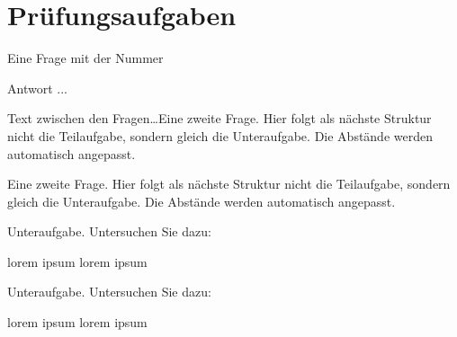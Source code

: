 \documentclass[a4paper,12pt]{article}
\begin{document}
\section{Prüfungsaufgaben}


\begin{question}
	Eine Frage mit der Nummer %
{}
\end{question}%
%
\begin{solution}
	Antwort ...
\end{solution}


Text zwischen den Fragen\ldots Eine zweite Frage. Hier folgt als nächste Struktur nicht die Teilaufgabe, sondern gleich die Unteraufgabe. Die Abstände werden automatisch angepasst.


\begin{question}
Eine zweite Frage. Hier folgt als nächste Struktur nicht die Teilaufgabe, sondern gleich die Unteraufgabe. Die Abstände werden automatisch angepasst.
\begin{subparts}
		\subpart Unteraufgabe. Untersuchen Sie  dazu:
	\begin{subsubparts}
		\subsubpart lorem ipsum
		\subsubpart lorem ipsum
	\end{subsubparts}
		\subpart Unteraufgabe. Untersuchen Sie  dazu:
	\begin{subsubparts}
		\subsubpart lorem ipsum
		\subsubpart lorem ipsum
	\end{subsubparts}
\end{subparts}
\end{question}
\omitsolution
\end{document}
